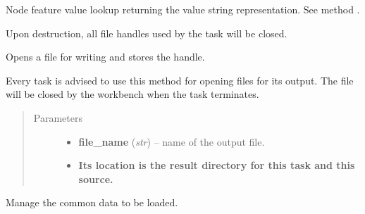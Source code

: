 \documentclass[letterpaper,10pt,english]{sphinxmanual}
\begin{document}
\begin{fulllineitems}
\begin{fulllineitems}
\end{fulllineitems}


\begin{fulllineitems}
\label{graf/graf:graf.GrafTask.FNr}
Node feature value lookup returning the value string representation.
See method {\hyperref[graf/graf:graf.GrafTask.FNi]{}}.

\end{fulllineitems}


\begin{fulllineitems}
\label{graf/graf:graf.GrafTask.__del__}
Upon destruction, all file handles used by the task will be closed.

\end{fulllineitems}


\begin{fulllineitems}
\label{graf/graf:graf.GrafTask.add_result}
Opens a file for writing and stores the handle.

Every task is advised to use this method for opening files for its output.
The file will be closed by the workbench when the task terminates.
\begin{quote}\begin{description}
\item[{Parameters}] \leavevmode\begin{itemize}
\item {} 
\textbf{file\_name} (\emph{str}) --
name of the output file.

\item {} 
\textbf{Its location is the result directory for this task and this source.}

\end{itemize}

\end{description}\end{quote}

\end{fulllineitems}


\begin{fulllineitems}
\label{graf/graf:graf.GrafTask.common_loader}
Manage the common data to be loaded.


\end{fulllineitems}
\end{fulllineitems}
\end{document}
